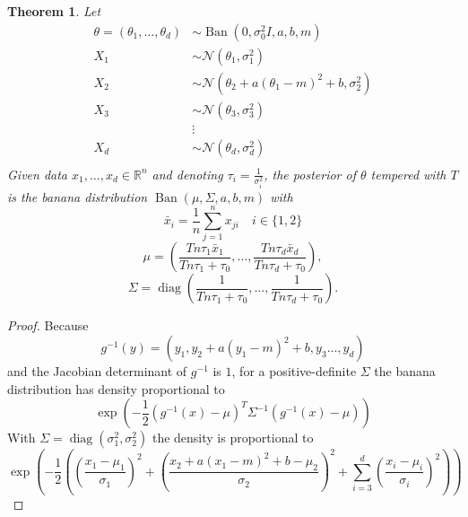 \documentclass[english,twoside,openright]{HYgraduMLDS}
\newtheorem{theorem}{Theorem}
\newcommand{\R}{\mathbb{R}}
\newcommand{\caln}{{\mathcal{N}}}
\DeclareMathOperator{\ban}{Ban}
\DeclareMathOperator{\diag}{diag}
\begin{document}
\begin{appendices}
\setcounter{temp_counter}{\value{theorem}}
\setcounter{theorem}{\value{banana_posterior_theorem_number}}
\addtocounter{theorem}{-1}
\begin{theorem}
    Let
    \begin{align*}
        \theta = (\theta_1,\dotsc, \theta_d) &\sim
        \ban(0, \sigma_0^2I, a, b, m) \\
        X_1 &\sim \caln(\theta_1, \sigma_1^2) \\
        X_2 &\sim \caln(\theta_2 + a(\theta_1 - m)^2 + b, \sigma_2^2)\\
        X_3 &\sim \caln(\theta_3, \sigma_3^2) \\
            &\vdots \\
        X_d &\sim \caln(\theta_d, \sigma_d^2) \\
    \end{align*}
    Given data \(x_1,\dotsc, x_d\in \R^n\) and
    denoting \(\tau_i = \frac{1}{\sigma_i^2}\),
    the posterior of \(\theta\) tempered with \(T\) is the banana distribution
    \(\ban(\mu, \Sigma, a, b, m)\)
    with
    \[
        \bar{x}_i = \frac{1}{n}\sum_{j=1}^n x_{ji} \quad i\in \{1, 2\}
    \]
    \[
        \mu = \left(\frac{Tn\tau_1\bar{x}_1}{Tn\tau_1 + \tau_0},\dotsc,
        \frac{Tn\tau_d\bar{x}_d}{Tn\tau_d + \tau_0}\right),
    \]
    \[
        \Sigma = \diag\left(
            \frac{1}{Tn\tau_1 + \tau_0},\dotsc,
            \frac{1}{Tn\tau_d + \tau_0}
        \right).
    \]
\end{theorem}
\begin{proof}
    Because
    \[
    g^{-1}(y) = (y_1, y_2 + a(y_1 - m)^2 + b, y_3\dotsc, y_d)
    \]
    and the Jacobian determinant of \(g^{-1}\) is \(1\),
    for a positive-definite \(\Sigma\) the banana distribution has
    density proportional to
    \[
    \exp\left(-\frac{1}{2}(g^{-1}(x) - \mu)^T\Sigma^{-1}(g^{-1}(x) - \mu)\right)
    \]
    With \(\Sigma = \diag(\sigma_1^2, \sigma_2^2)\) the density is proportional
    to
    \[
    \exp
    \left(-\frac{1}{2}\left(\left(\frac{x_1 - \mu_1}{\sigma_1}\right)^2
    + \left(\frac{x_2 + a(x_1 - m)^2 + b - \mu_2}{\sigma_2}\right)^2
    + \sum_{i=3}^d\left(\frac{x_i - \mu_i}{\sigma_i}\right)^2\right)\right)
    \]


\end{proof}
\end{appendices}
\end{document}
